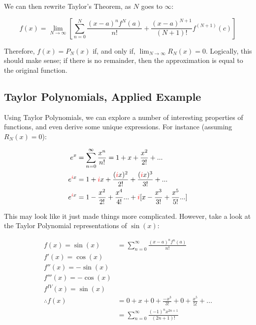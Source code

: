 \documentclass[12pt]{article}
\begin{document}
We can then rewrite Taylor's Theorem, as $N$ goes to $\infty$:

$$f(x) = \lim_{N\to\infty}[\sum_{n=0}^N \frac{(x-a)^n f^{N}(a)}{n!} + \frac{(x-a)^{N+1}}{(N+1)!} f^{(N+1)}(c)]$$

Therefore, $f(x) = P_N(x)$ if, and only if, $\lim_{N\to\infty} R_N(x) = 0$. Logically, this should make sense; if there is no remainder, then the approximation is equal to the original function.

\subsection{Taylor Polynomials, Applied Example}\label{sec:taylorcomplex}

Using Taylor Polynomials, we can explore a number of interesting properties of functions, and even derive some unique expressions. For instance (assuming $R_N(x) = 0$):

\begin{equation}\label{eqn:taylorexp}
    \begin{split}
    e^x &= \sum_{n=0}^{\infty} \frac{x^n}{n!} = 1 + x + \frac{x^2}{2!} + ...\\
    e^{\textcolor{red}{i}x} &= 1 + \textcolor{red}{i}x + \frac{(\textcolor{red}{i}x)^2}{2!} + \frac{(\textcolor{red}{i}x)^3}{3!} + ...\\
    e^{\textcolor{red}{i}x} &= 1 -\frac{x^2}{2!} + \frac{x^4}{4!}...+\textcolor{red}{i}[x - \frac{x^3}{3!} + \frac{x^5}{5!}...]\\
    \end{split}
\end{equation}

This may look like it just made things more complicated. However, take a look at the Taylor Polynomial representations of $\sin(x)$:

\begin{equation}
    \begin{split}
        f(x) = \sin(x) &= \sum_{n=0}^{\infty} \frac{(x-a)^n f^n(a)}{n!}\\
        f'(x) = \cos(x)\\
        f''(x) = -\sin(x)\\
        f'''(x) = -\cos(x)\\
        f^{IV}(x) = \sin(x)\\
        \therefore f(x) &= 0 + x + 0 + \frac{-x^3}{3!} + 0 + \frac{x^5}{5!} + ...\\
        &= \sum_{n=0}^{\infty}\frac{(-1)^n x^{2n+1}}{(2n+1)!}\\
    \end{split}
\end{equation}
\end{document}
